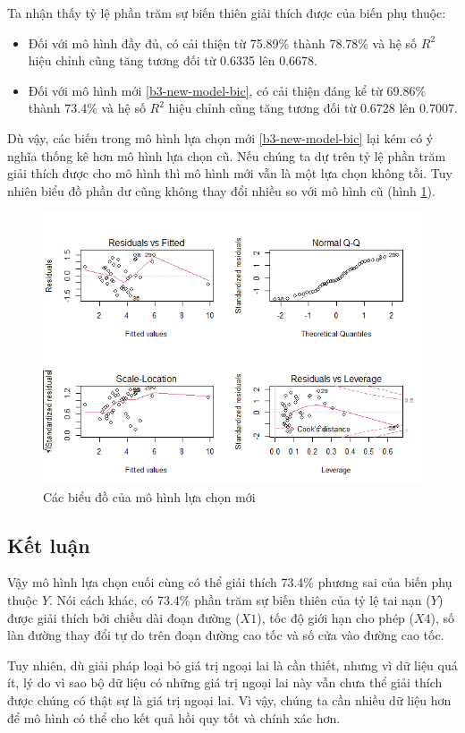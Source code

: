 Ta nhận thấy tỷ lệ phần trăm sự biến thiên giải thích được của biến phụ thuộc:
\begin{itemize}
	\item Đối với mô hình đầy đủ, có cải thiện từ 75.89\% thành 78.78\% và hệ số $R^2$ hiệu chỉnh cũng tăng tương đối từ 0.6335 lên 0.6678. 
	\item Đối với mô hình mới \ref{b3-new-model-bic}, có cải thiện đáng kể từ 69.86\% thành 73.4\% và hệ số $R^2$ hiệu chỉnh cũng tăng tương đối từ 0.6728 lên 0.7007. 
\end{itemize}

Dù vậy, các biến trong mô hình lựa chọn mới \ref{b3-new-model-bic} lại kém có ý nghĩa thống kê hơn mô hình lựa chọn cũ. Nếu chúng ta dự trên tỷ lệ phần trăm giải thích được cho mô hình thì mô hình mới vẫn là một lựa chọn không tồi. Tuy nhiên biểu đồ phần dư cũng không thay đổi nhiều so với mô hình cũ (hình \ref{fig-b3:new-model-bic-plot}).
\begin{figure}[H]
	\centering
	\includegraphics[width=0.7\linewidth]{images/B3/new-model-bic-plot}
	\caption{Các biểu đồ của mô hình lựa chọn mới}
	\label{fig-b3:new-model-bic-plot}
\end{figure}

\subsection*{Kết luận}

Vậy mô hình lựa chọn cuối cùng có thể giải thích 73.4\% phương sai của biến phụ thuộc $Y$. Nói cách khác, có 73.4\% phần trăm sự biến thiên của tỷ lệ tai nạn ($Y$) được giải thích bởi chiều dài đoạn đường ($X1$), tốc độ giới hạn cho phép ($X4$), số làn đường thay đổi tự do trên đoạn đường cao tốc và số cửa vào đường cao tốc.

Tuy nhiên, dù giải pháp loại bỏ giá trị ngoại lai là cần thiết, nhưng vì dữ liệu quá ít, lý do vì sao bộ dữ liệu có những giá trị ngoại lai này vẫn chưa thể giải thích được chúng có thật sự là giá trị ngoại lai. Vì vậy, chúng ta cần nhiều dữ liệu hơn để mô hình có thể cho kết quả hồi quy tốt và chính xác hơn.